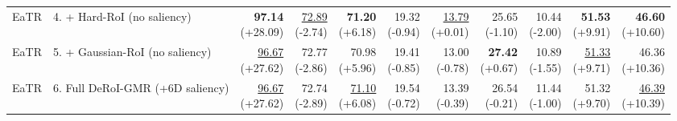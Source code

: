 \documentclass{article}
\begin{document}
{\begin{tabular}{llrrrrrrrrr}
EaTR & 4. + Hard-RoI (no saliency) & \shortstack{\textbf{97.14} \\ {\scriptsize (+28.09)}} & \shortstack{\underline{72.89} \\ {\scriptsize (-2.74)}} & \shortstack{\textbf{71.20} \\ {\scriptsize (+6.18)}} & \shortstack{19.32 \\ {\scriptsize (-0.94)}} & \shortstack{\underline{13.79} \\ {\scriptsize (+0.01)}} & \shortstack{25.65 \\ {\scriptsize (-1.10)}} & \shortstack{10.44 \\ {\scriptsize (-2.00)}} & \shortstack{\textbf{51.53} \\ {\scriptsize (+9.91)}} & \shortstack{\textbf{46.60} \\ {\scriptsize (+10.60)}} \\
EaTR & 5. + Gaussian-RoI (no saliency) & \shortstack{\underline{96.67} \\ {\scriptsize (+27.62)}} & \shortstack{72.77 \\ {\scriptsize (-2.86)}} & \shortstack{70.98 \\ {\scriptsize (+5.96)}} & \shortstack{19.41 \\ {\scriptsize (-0.85)}} & \shortstack{13.00 \\ {\scriptsize (-0.78)}} & \shortstack{\textbf{27.42} \\ {\scriptsize (+0.67)}} & \shortstack{10.89 \\ {\scriptsize (-1.55)}} & \shortstack{\underline{51.33} \\ {\scriptsize (+9.71)}} & \shortstack{46.36 \\ {\scriptsize (+10.36)}} \\
EaTR & 6. Full DeRoI-GMR (+6D saliency) & \shortstack{\underline{96.67} \\ {\scriptsize (+27.62)}} & \shortstack{72.74 \\ {\scriptsize (-2.89)}} & \shortstack{\underline{71.10} \\ {\scriptsize (+6.08)}} & \shortstack{19.54 \\ {\scriptsize (-0.72)}} & \shortstack{13.39 \\ {\scriptsize (-0.39)}} & \shortstack{26.54 \\ {\scriptsize (-0.21)}} & \shortstack{11.44 \\ {\scriptsize (-1.00)}} & \shortstack{51.32 \\ {\scriptsize (+9.70)}} & \shortstack{\underline{46.39} \\ {\scriptsize (+10.39)}} \\

\end{tabular}}
\end{document}
